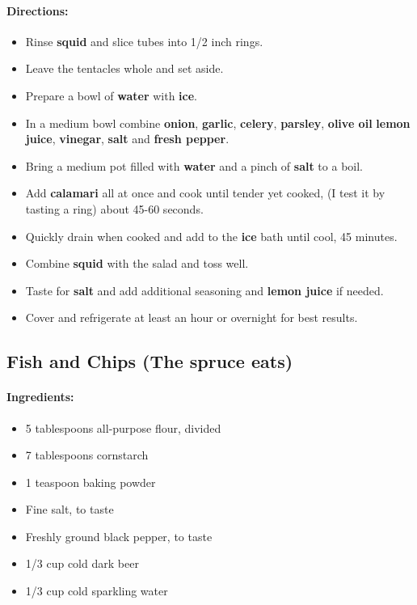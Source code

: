 \documentclass{article}
\begin{document}
\paragraph{Directions:}
\begin{itemize}
    \item Rinse \textbf{squid} and slice tubes into 1/2 inch rings.
    \item Leave the tentacles whole and set aside.
    \item Prepare a bowl of \textbf{water} with \textbf{ice}.
    \item In a medium bowl combine \textbf{onion}, \textbf{garlic}, \textbf{celery}, \textbf{parsley}, \textbf{olive oil} \textbf{lemon juice}, \textbf{vinegar}, \textbf{salt} and \textbf{fresh pepper}.
    \item Bring a medium pot filled with \textbf{water} and a pinch of \textbf{salt} to a boil.
    \item Add \textbf{calamari} all at once and cook until tender yet cooked, (I test it by tasting a ring) about 45-60 seconds.
    \item Quickly drain when cooked and add to the \textbf{ice} bath until cool, 45 minutes.
    \item Combine \textbf{squid} with the salad and toss well.
    \item Taste for \textbf{salt} and add additional seasoning and \textbf{lemon juice} if needed.
    \item Cover and refrigerate at least an hour or overnight for best results.
\end{itemize}

\subsection{Fish and Chips (The spruce eats)}

\paragraph{Ingredients:}
\begin{itemize}
    \item 5 tablespoons all-purpose flour, divided
    \item 7 tablespoons cornstarch
    \item 1 teaspoon baking powder
    \item Fine salt, to taste
    \item Freshly ground black pepper, to taste
    \item 1/3 cup cold dark beer
    \item 1/3 cup cold sparkling water
\end{itemize}
\end{document}
